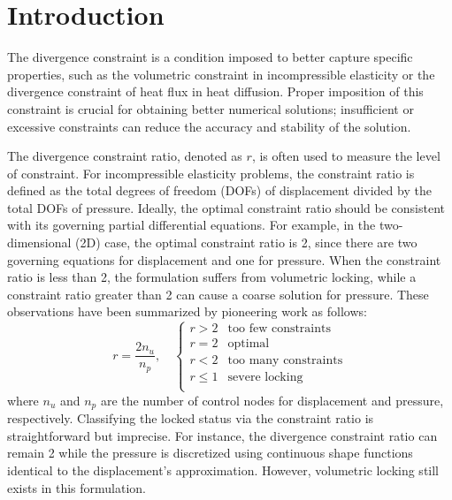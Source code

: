 \section{Introduction}

The divergence constraint is a condition imposed to better capture specific properties, such as the volumetric constraint in incompressible elasticity or the divergence constraint of heat flux in heat diffusion. Proper imposition of this constraint is crucial for obtaining better numerical solutions; insufficient or excessive constraints can reduce the accuracy and stability of the solution.

The divergence constraint ratio, denoted as $r$, is often used to measure the level of constraint. For incompressible elasticity problems, the constraint ratio is defined as the total degrees of freedom (DOFs) of displacement divided by the total DOFs of pressure. Ideally, the optimal constraint ratio should be consistent with its governing partial differential equations. For example, in the two-dimensional (2D) case, the optimal constraint ratio is 2, since there are two governing equations for displacement and one for pressure. When the constraint ratio is less than 2, the formulation suffers from volumetric locking, while a constraint ratio greater than 2 can cause a coarse solution for pressure. These observations have been summarized by pioneering work \cite{hughes2000} as follows:
\begin{equation}
r = \frac{2n_u}{n_p}, \quad 
\begin{cases}
r > 2 & \text{too few constraints} \\
r = 2 & \text{optimal} \\
r < 2 & \text{too many constraints} \\
r \le 1 & \text{severe locking} \\
\end{cases}
\end{equation}
where $n_u$ and $n_p$ are the number of control nodes for displacement and pressure, respectively. Classifying the locked status via the constraint ratio is straightforward but imprecise. For instance, the divergence constraint ratio can remain 2 while the pressure is discretized using continuous shape functions identical to the displacement's approximation. However, volumetric locking still exists in this formulation.

